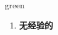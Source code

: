 
\begin{frame}
{\huge green}
\begin{center}
\begin{enumerate}\Large
  \item \textbf{无经验的}
\end{enumerate}
\end{center}
\end{frame}
